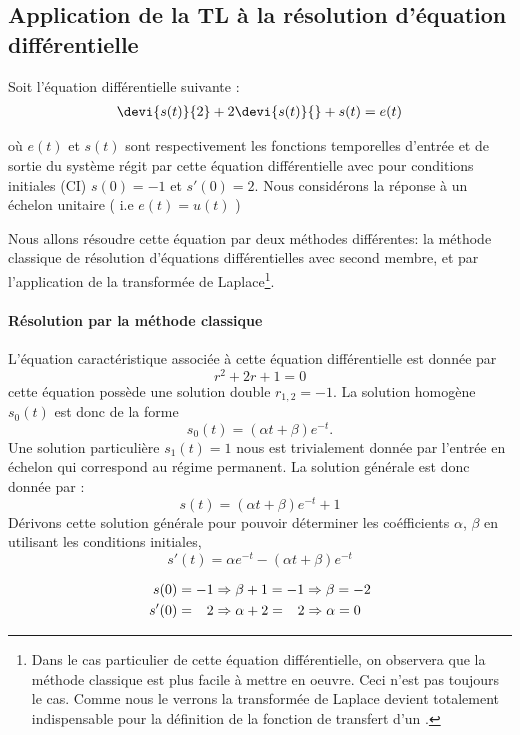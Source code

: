 \subsection[Application de la transformée de Laplace]{Application de la TL à la résolution d'équation différentielle}

Soit l'équation différentielle suivante :
\begin{align}
\devi{s(t)}{2}+2\devi{s(t)}{} + s(t) = e(t)\label{eq-diff1}
\end{align}

où $e(t)$ et $s(t)$ sont respectivement les fonctions temporelles d'entrée et de sortie du système
régit par cette équation différentielle avec pour conditions initiales (CI) 
$s(0)=-1$ et $s'(0)=2$.
Nous considérons la réponse à un échelon unitaire ( i.e $e(t)=u(t)$ ) 

Nous allons résoudre cette équation par deux méthodes différentes: la méthode classique 
de résolution d'équations différentielles avec second membre, 
et par l'application de la transformée de Laplace\footnote{Dans le cas particulier
de cette équation différentielle, on observera que la méthode classique est plus 
facile à mettre en oeuvre. Ceci n'est pas toujours le cas. 
Comme nous le verrons la transformée de Laplace devient totalement indispensable pour la 
définition de la fonction de transfert d'un \SLCI.}.
\paragraph{Résolution par la méthode \og classique\fg}
L'équation caractéristique associée à cette équation différentielle est donnée par 
$$
r^2+2r+1=0
$$
cette équation possède une solution double $r_{1,2}=-1$.
La solution homogène $s_0(t)$ est donc de la forme
$$
s_0(t)=(\alpha t+\beta)e^{-t}.
$$
Une solution particulière $s_1(t)=1$ nous est trivialement donnée par l'entrée en échelon qui correspond au 
régime permanent.
La solution générale est donc donnée par :
$$
s(t)=(\alpha t+\beta)e^{-t}+1
$$
Dérivons cette solution générale pour pouvoir déterminer les coéfficients $\alpha$, $\beta$ en utilisant
les conditions initiales,
$$
s'(t)=\alpha e^{-t}-(\alpha t+\beta)e^{-t}
$$

\begin{align*}
     s(0)&=-1\Rightarrow\beta+1=-1\Rightarrow\beta=-2 \\
    s'(0)&=\hphantom{-}2\Rightarrow\alpha+2=\hphantom{-}2\Rightarrow\alpha=0
\end{align*}

